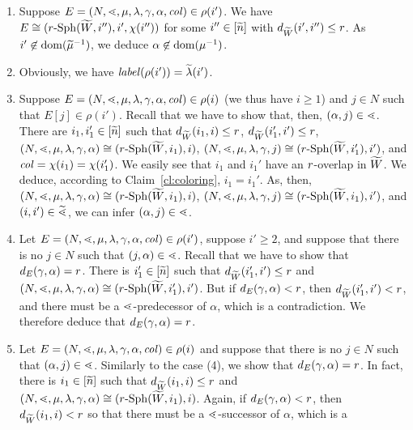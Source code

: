 \documentclass{LMCS}
\begin{document}
\begin{enumerate}[(1)]
\item Suppose $E=(N,\mathord{\lessdot},\mu,\lambda,\gamma,\alpha,\mathit{col}) \in
  \rho(i')$. We have $E \cong (r\text{-}\mathrm{Sph}({\widetilde{W}},i''),i',\chi(i''))$ for some
  $i'' \in [\widetilde{n}]$ with $d_{{\widetilde{W}}}(i',i'') \le r$. As $i' \not\in
  \mathrm{dom}(\widetilde{\mu}^{-1})$, we deduce $\alpha \not\in \mathrm{dom}(\mu^{-1})$.
\item Obviously, we have $\mathit{label}(\rho(i')) = \widetilde{\lambda}(i')$.
\item Suppose $E=(N,\mathord{\lessdot},\mu,\lambda,\gamma,\alpha,\mathit{col}) \in
  \rho(i)$ (we thus have $i \ge 1$) and $j \in N$ such that $E[j] \in
  \rho(i')$. Recall that we have to show that, then, $(\alpha,j) \in
  \mathord{\lessdot}$. There are $i_1,i_1' \in [\widetilde{n}]$ such that $d_{\widetilde{W}}(i_1,i) \le
  r$, $d_{\widetilde{W}}(i_1',i') \le r$,
  $(N,\mathord{\lessdot},\mu,\lambda,\gamma,\alpha) \cong (r\text{-}\mathrm{Sph}({\widetilde{W}},i_1),i)$,
  $(N,\mathord{\lessdot},\mu,\lambda,\gamma,j) \cong (r\text{-}\mathrm{Sph}({\widetilde{W}},i_1'),i')$, and
  $\mathit{col} = \chi(i_1) = \chi(i_1')$. We easily see that $i_1$ and $i_1'$ have
  an $r$-overlap in ${\widetilde{W}}$. We deduce, according to
  Claim~\ref{cl:coloring}, $i_1 = i_1'$. As, then,
  $(N,\mathord{\lessdot},\mu,\lambda,\gamma,\alpha) \cong (r\text{-}\mathrm{Sph}({\widetilde{W}},i_1),i)$,
  $(N,\mathord{\lessdot},\mu,\lambda,\gamma,j) \cong (r\text{-}\mathrm{Sph}({\widetilde{W}},i_1),i')$, and
  $(i,i') \in \widetilde{\mathord{\lessdot}}$, we can infer $(\alpha,j) \in \mathord{\lessdot}$.
\item Let $E=(N,\mathord{\lessdot},\mu,\lambda,\gamma,\alpha,\mathit{col}) \in \rho(i')$,
  suppose $i' \ge 2$, and suppose that there is no $j \in N$ such that
  $(j,\alpha) \in \mathord{\lessdot}$. Recall that we have to show that
  $d_E(\gamma,\alpha)=r$. There is $i_1' \in [\widetilde{n}]$ such that
  $d_{\widetilde{W}}(i_1',i') \le r$ and $(N,\mathord{\lessdot},\mu,\lambda,\gamma,\alpha)
  \cong (r\text{-}\mathrm{Sph}({\widetilde{W}},i_1'),i')$. But if $d_E(\gamma,\alpha) < r$,
  then $d_{\widetilde{W}}(i_1',i') < r$, and there must be a $\mathord{\lessdot}$-predecessor
  of $\alpha$, which is a contradiction. We therefore deduce that
  $d_E(\gamma,\alpha)=r$.
\item Let $E=(N,\mathord{\lessdot},\mu,\lambda,\gamma,\alpha,\mathit{col}) \in \rho(i)$
  and suppose that there is no $j \in N$ such that $(\alpha,j) \in \mathord{\lessdot}$.
  Similarly to the case (4), we show that $d_E(\gamma,\alpha)=r$. In
  fact, there is $i_1 \in [\widetilde{n}]$ such that $d_{\widetilde{W}}(i_1,i) \le r$ and
  $(N,\mathord{\lessdot},\mu,\lambda,\gamma,\alpha) \cong (r\text{-}\mathrm{Sph}({\widetilde{W}},i_1),i)$.
  Again, if $d_E(\gamma,\alpha) < r$, then $d_{\widetilde{W}}(i_1,i) < r$ so
  that there must be a $\mathord{\lessdot}$-successor of $\alpha$, which is a

\end{enumerate}
\end{document}
